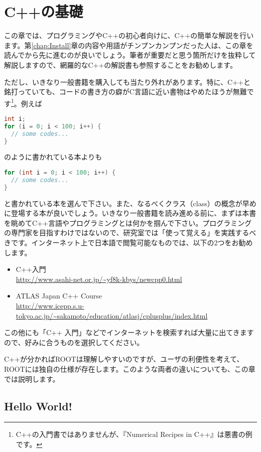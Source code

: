 \chapter{C++の基礎}
\label{chap:C++}

この章では、プログラミングやC++の初心者向けに、C++の簡単な解説を行います。第\ref{chap:Install}章の内容や用語がチンプンカンプンだった人は、この章を読んでから先に進むのが良いでしょう。筆者が重要だと思う箇所だけを抜粋して解説しますので、網羅的なC++の解説書も参照することをお勧めします。

ただし、いきなり一般書籍を購入しても当たり外れがあります。特に、C++と銘打っていても、コードの書き方の癖がC言語に近い書物はやめたほうが無難です\footnote{C++の入門書ではありませんが、『Numerical Recipes in C++』は悪書の例です。}。例えば
\begin{lstlisting}[language=c++]
int i;
for (i = 0; i < 100; i++) {
  // some codes...
}
\end{lstlisting}
のように書かれている本よりも
\begin{lstlisting}[language=c++]
for (int i = 0; i < 100; i++) {
  // some codes...
}
\end{lstlisting}
と書かれている本を選んで下さい。また、なるべくクラス（class）の概念が早めに登場する本が良いでしょう。いきなり一般書籍を読み進める前に、まずは本書を眺めてC++言語やプログラミングとは何かを掴んで下さい。プログラミングの専門家を目指すわけではないので、研究室では「使って覚える」を実践するべきです。インターネット上で日本語で閲覧可能なものでは、以下の2つをお勧めします。
\begin{itemize}
\item C++入門\\
\url{http://www.asahi-net.or.jp/~yf8k-kbys/newcpp0.html}
\item ATLAS Japan C++ Course\\
\url{http://www.icepp.s.u-tokyo.ac.jp/~sakamoto/education/atlasj/cplusplus/index.html}
\end{itemize}
この他にも「C++ 入門」などでインターネットを検索すれば大量に出てきますので、好みに合うものを選択してください。

C++が分かればROOTは理解しやすいのですが、ユーザの利便性を考えて、ROOTには独自の仕様が存在します。このような両者の違いについても、この章では説明します。 
\clearpage
\section{Hello World!}
